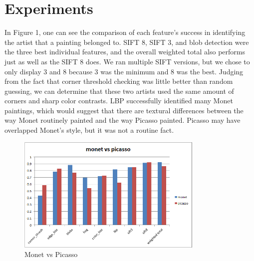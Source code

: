 \documentclass{article}
\begin{document}
  \section{Experiments}
  In Figure 1, one can see the comparison of each feature's
  success in identifying the artist that a painting belonged to. SIFT 8, SIFT
  3, and blob detection were the three best individual features, and the overall
  weighted total also performs just as well as the SIFT 8 does. We ran multiple
  SIFT versions, but we chose to only display 3 and 8 because 3 was the minimum
  and 8 was the best. Judging from the fact that corner threshold checking was
  little better than random guessing, we can determine that these two artists
  used the same amount of corners and sharp color contrasts. LBP successfully
  identified many Monet paintings, which would suggest that there are textural
  differences between the way Monet routinely painted and the way Picasso
  painted. Picasso may have overlapped Monet's style, but it was not a routine
  fact.
  \begin{figure}[h!]
    \begin{center}
      \includegraphics[width=3.5in]{graphs/monet_picasso.png}
      \caption{Monet vs Picasso}
    \end{center}
  \end{figure} \\
\end{document}
